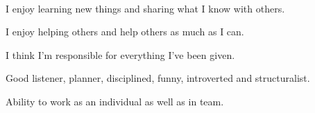 

    ‌

    \begin{cvitems} %
        \item {I enjoy learning new things and sharing what I know with others.}
        \item {I enjoy helping others and help others as much as I can.}
        \item {I think I'm responsible for everything I've been given.}
        \item {Good listener, planner, disciplined, funny, introverted and structuralist.}
        \item {Ability to work as an individual as well as in team.}
    \end{cvitems}
